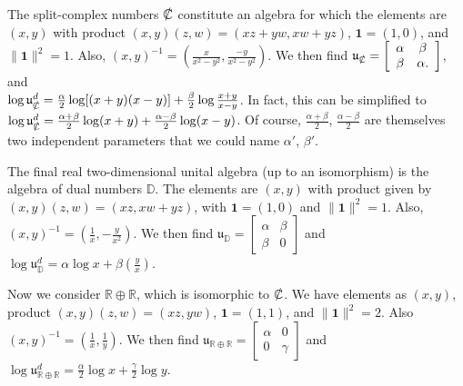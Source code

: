 \documentclass{amsart}
\numberwithin{equation}{section}
\theoremstyle{definition}
\numberwithin{theorem}{section}
\begin{document}
The split-complex numbers $\slashed{\mathbb{C}}$ constitute an algebra for which the elements are  $(x,y)$ with product $(x,y)(z,w) = (xz+yw,xw+yz)$, $ \mathbf{1} = (1,0)$, and $\|\mathbf{1}\|^2 = 1$.  Also, $(x,y)^{-1} = (\frac{x}{x^2-y^2},\frac{-y}{x^2-y^2})$. \hspace{1cm}  We then find $\mathfrak{u}_{\slashed{\mathbb{C}}} = \left[\begin{array}{ccc}
 \alpha & \beta   \\ 
 \beta & \alpha.    
\end{array}\right]$, \hspace{.5cm} and \hfill \\ $\log  \mathfrak{u}^d_{\slashed{\mathbb{C}}} = \frac{\alpha}{2}\log[(x+
y)(x-y)] +  \frac{\beta}{2}\log \frac{x+y}{x-y}$.  In fact, this can be simplified to $\log  \mathfrak{u}^d_{\slashed{\mathbb{C}}} = \frac{\alpha+\beta}{2}\log(x+y) + \frac{\alpha-\beta}{2}\log(x-y)$.  Of course, $\frac{\alpha+\beta}{2}$, $\frac{\alpha-\beta}{2}$ are themselves two independent parameters that we could name $\alpha'$, $\beta'$.

The final real two-dimensional unital algebra (up to an isomorphism) is the algebra of dual numbers $\mathbb{D}$.  The elements are $(x,y)$ with product given by $(x,y)(z,w) = (xz,xw+yz)$, with $\mathbf{1}=(1,0)$ and $\|\mathbf{1}\|^2 = 1$. Also, $(x,y)^{-1} = (\frac{1}{x},-\frac{y}{x^2})$.  We then find $\mathfrak{u}_\mathbb{D} = \left[\begin{array}{ccc}
 \alpha & \beta   \\ 
 \beta & 0    
\end{array}\right]$ and $\log  \mathfrak{u}^d_{\mathbb{D}} = \alpha\log x + \beta\left(\frac{y}{x}\right)$. 

   
   Now we consider $\mathbb{R}\oplus\mathbb{R}$, which is isomorphic to $\slashed{\mathbb{C}}$.  We have elements as $(x,y)$, product $(x,y)(z,w) = (xz,yw)$, $\mathbf{1}=(1,1)$, and $\|\mathbf{1}\|^2 = 2$.  Also $(x,y)^{-1} = (\frac{1}{x},\frac{1}{y})$.  We then find $\mathfrak{u}_{\mathbb{R}\oplus\mathbb{R}} = \left[\begin{array}{ccc}
 \alpha & 0   \\ 
 0 & \gamma    
\end{array}\right]$ and $\log  \mathfrak{u}^d_{\mathbb{R}\oplus\mathbb{R}} = \frac{\alpha}{2}\log x + \frac{\gamma}{2}\log y$. 
\end{document}
